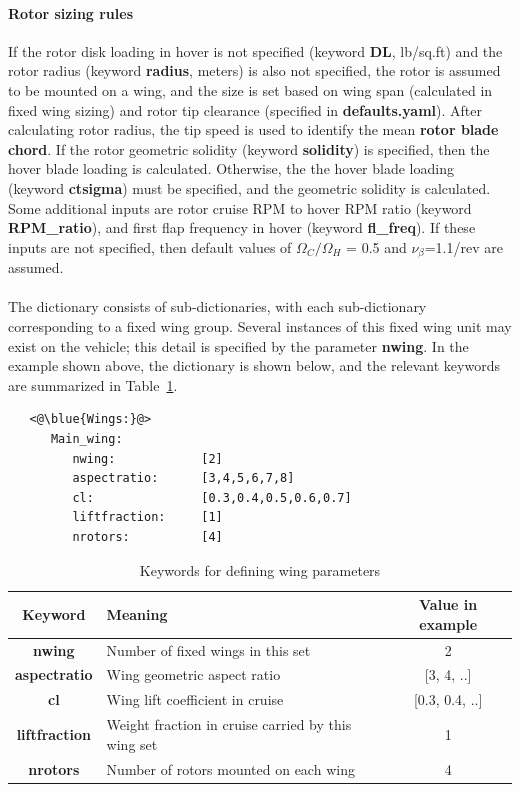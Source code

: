 \paragraph*{Rotor sizing rules}
If the rotor disk loading in hover is not specified (keyword \textbf{DL}, lb/sq.ft) and the rotor radius (keyword \textbf{radius}, meters) is also not specified, the rotor is assumed to be mounted on a wing, and the size is set based on wing span (calculated in fixed wing sizing) and rotor tip clearance (specified in \textbf{defaults.yaml}). After calculating rotor radius, the tip speed is used to identify the mean \textbf{rotor blade chord}. If the rotor geometric solidity (keyword \textbf{solidity}) is specified, then the hover blade loading is calculated. Otherwise, the the hover blade loading (keyword \textbf{ctsigma}) must be specified, and the geometric solidity is calculated. Some additional inputs are rotor cruise RPM to hover RPM ratio (keyword \textbf{RPM\_ratio}), and first flap frequency in hover (keyword \textbf{fl\_freq}). If these inputs are not specified, then default values of $\Omega_C/\Omega_H$ = 0.5 and $\nu_\beta$=1.1/rev are assumed. 

\paragraph{}
The  dictionary consists of sub-dictionaries, with each sub-dictionary corresponding to a fixed wing group. Several instances of this fixed wing unit may exist on the vehicle; this detail is specified by the parameter \textbf{nwing}. In the example shown above, the  dictionary is shown below, and the relevant keywords are summarized in Table~\ref{tbl:wing_keywords}.

\begin{lstlisting}
   <@\blue{Wings:}@>
      Main_wing:
         nwing:            [2]
         aspectratio:      [3,4,5,6,7,8] 
         cl:               [0.3,0.4,0.5,0.6,0.7]
         liftfraction:     [1]
         nrotors:          [4]
\end{lstlisting}

\begin{center}
  \begin{table}[H]
	\caption{Keywords for defining wing parameters}
	\label{tbl:wing_keywords}
    \begin{tabular}{| c | l | c |}
    \hline
    Keyword & Meaning & Value in example \\ 
    \hline
\textbf{nwing} & Number of fixed wings in this set &  2 \\
\textbf{aspectratio} & Wing geometric aspect ratio & [3, 4, ..] \\
\textbf{cl} & Wing lift coefficient in cruise & [0.3, 0.4, ..] \\
\textbf{liftfraction} & Weight fraction in cruise carried by this wing set & 1 \\
\textbf{nrotors} & Number of rotors mounted on each wing & 4 \\
     \hline
  \end{tabular}
\end{table}
\end{center}
\vspace{-1cm}

